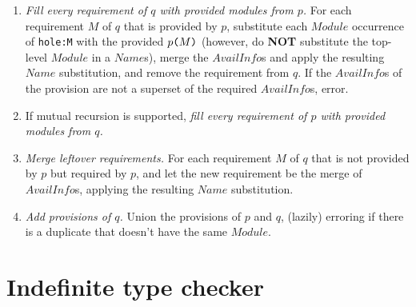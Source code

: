 \documentclass{article}
\newcommand{\I}[1]{\ensuremath{\mathit{#1}}}
\begin{document}
\begin{enumerate}
    \item \emph{Fill every requirement of $q$ with provided modules from
        $p$.} For each requirement $M$ of $q$ that is provided by $p$,
        substitute each \I{Module} occurrence of \verb|hole:M| with the
        provided $p\verb|(|M\verb|)|$ (however, do \textbf{NOT} substitute the
        top-level \I{Module} in a \I{Name}s), merge the \I{AvailInfo}s and apply
        the resulting \I{Name} substitution, and
        remove the requirement from $q$.  If the \I{AvailInfo}s of the
        provision are not a superset of the required \I{AvailInfo}s,
        error.
    \item If mutual recursion is supported, \emph{fill every requirement
        of $p$ with provided modules from $q$.}
    \item \emph{Merge leftover requirements.}  For each requirement $M$
        of $q$ that is not provided by $p$ but required by $p$, and let
        the new requirement be the merge of
        \I{AvailInfo}s, applying the resulting \I{Name} substitution.
    \item \emph{Add provisions of $q$.} Union the provisions of $p$ and $q$, (lazily) erroring
        if there is a duplicate that doesn't have the same \I{Module}.
\end{enumerate}

\newpage
\section{Indefinite type checker}
\end{document}
